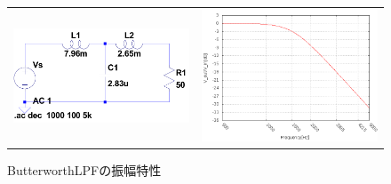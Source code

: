 \documentclass[10pt,a4j,dvipdfmx]{jsarticle}
\begin{document}
\begin{figure}[H]
    \begin{tabular}{cc}
      \begin{minipage}[t]{0.45\hsize}
        \centering
        \includegraphics[width=8cm]{ButLPF.png}
        \caption{ButterworthLPF($f_c = 1500$)}
      \end{minipage} &
      \begin{minipage}[t]{0.45\hsize}
        \centering
        \includegraphics[width = 8cm]{BLPF_Vgraf.png}
        \caption{ButterworthLPFの振幅特性}
      \end{minipage}
    \end{tabular}
  \end{figure}
\end{document}

